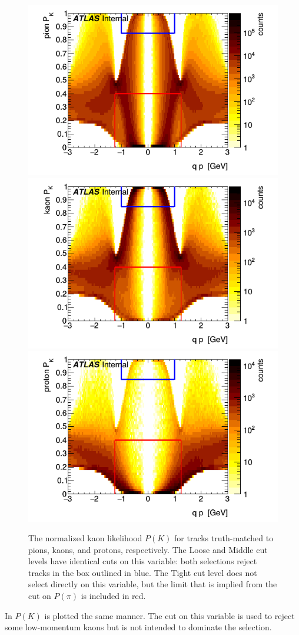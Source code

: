 \begin{figure}[t]
\begin{minipage}[t]{1.0\textwidth}
\centering
\includegraphics[width=.32\linewidth]{P_pion_K.png}
\includegraphics[width=.32\linewidth]{P_kaon_K.png}
\includegraphics[width=.32\linewidth]{P_proton_K.png}
\end{minipage}
\caption{The normalized kaon likelihood $P(K)$ for tracks truth-matched to pions, kaons, and protons, respectively. The Loose and Middle cut levels have identical cuts on this variable: both selections reject tracks in the box outlined in blue. The Tight cut level does not select directly on this variable, but the limit that is implied from the cut on $P(\pi)$ is included in red.}
\label{fig:prob_k}
\end{figure}

In  $P(K)$ is plotted the same manner.
The cut on this variable is used to reject some low-momentum kaons but is not intended to dominate the selection.

